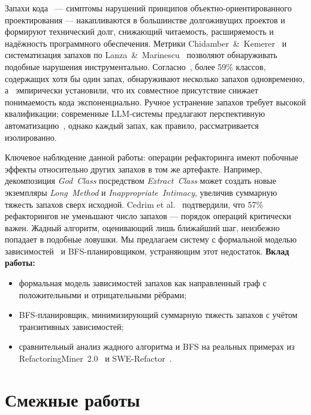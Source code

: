 \documentclass[conference]{IEEEtran}
\begin{document}
Запахи кода~\cite{fowler1999} --- симптомы нарушений принципов
объектно-ориентированного проектирования --- накапливаются в большинстве
долгоживущих проектов и формируют технический долг, снижающий читаемость,
расширяемость и надёжность программного обеспечения.
Метрики Chidamber~\&~Kemerer~\cite{ck1994} и систематизация запахов по
Lanza~\&~Marinescu~\cite{lanza2006} позволяют обнаруживать подобные
нарушения инструментально.
Согласно~\cite{palomba2018}, более 59\% классов, содержащих хотя бы один запах,
обнаруживают несколько запахов одновременно, а~\cite{abbes2011} эмпирически
установили, что их совместное присутствие снижает понимаемость кода
экспоненциально.
Ручное устранение запахов требует высокой квалификации; современные LLM-системы
предлагают перспективную автоматизацию~\cite{ismell2024}, однако каждый запах,
как правило, рассматривается изолированно.

Ключевое наблюдение данной работы: операции рефакторинга имеют побочные эффекты
относительно других запахов в том же артефакте.
Например, декомпозиция \textit{God~Class} посредством \textit{Extract~Class}
может создать новые экземпляры \textit{Long~Method} и
\textit{Inappropriate~Intimacy}, увеличив суммарную тяжесть запахов сверх
исходной.
Cedrim et al.~\cite{cedrim2017} подтвердили, что 57\% рефакторингов не
уменьшают число запахов --- порядок операций критически важен.
Жадный алгоритм, оценивающий лишь ближайший шаг, неизбежно попадает в
подобные ловушки.
Мы предлагаем систему с формальной моделью зависимостей~\cite{markovic2020}
и BFS-планировщиком, устраняющим этот недостаток.
\textbf{Вклад работы:}
\begin{itemize}
  \item формальная модель зависимостей запахов как направленный граф
        с положительными и отрицательными рёбрами;
  \item BFS-планировщик, минимизирующий суммарную тяжесть запахов
        с учётом транзитивных зависимостей;
  \item сравнительный анализ жадного алгоритма и BFS на реальных
        примерах из RefactoringMiner~2.0~\cite{rminer2022}
        и SWE-Refactor~\cite{swerefactor2024}.
\end{itemize}

\section{Смежные работы}
\end{document}
